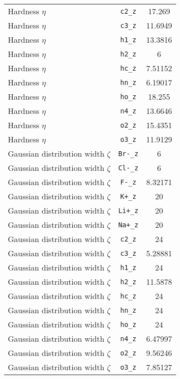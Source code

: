 \begin{table}[ht]
\begin{tabular}{lcc}
Hardness $\eta$ & \verb^c2_z^ & 17.269 \\ 
Hardness $\eta$ & \verb^c3_z^ & 11.6949 \\ 
Hardness $\eta$ & \verb^h1_z^ & 13.3816 \\ 
Hardness $\eta$ & \verb^h2_z^ & 6 \\ 
Hardness $\eta$ & \verb^hc_z^ & 7.51152 \\ 
Hardness $\eta$ & \verb^hn_z^ & 6.19017 \\ 
Hardness $\eta$ & \verb^ho_z^ & 18.255 \\ 
Hardness $\eta$ & \verb^n4_z^ & 13.6646 \\ 
Hardness $\eta$ & \verb^o2_z^ & 15.4351 \\ 
Hardness $\eta$ & \verb^o3_z^ & 11.9129 \\ 
Gaussian distribution width $\zeta$ & \verb^Br-_z^ & 6 \\ 
Gaussian distribution width $\zeta$ & \verb^Cl-_z^ & 6 \\ 
Gaussian distribution width $\zeta$ & \verb^F-_z^ & 8.32171 \\ 
Gaussian distribution width $\zeta$ & \verb^K+_z^ & 20 \\ 
Gaussian distribution width $\zeta$ & \verb^Li+_z^ & 20 \\ 
Gaussian distribution width $\zeta$ & \verb^Na+_z^ & 20 \\ 
Gaussian distribution width $\zeta$ & \verb^c2_z^ & 24 \\ 
Gaussian distribution width $\zeta$ & \verb^c3_z^ & 5.28881 \\ 
Gaussian distribution width $\zeta$ & \verb^h1_z^ & 24 \\ 
Gaussian distribution width $\zeta$ & \verb^h2_z^ & 11.5878 \\ 
Gaussian distribution width $\zeta$ & \verb^hc_z^ & 24 \\ 
Gaussian distribution width $\zeta$ & \verb^hn_z^ & 24 \\ 
Gaussian distribution width $\zeta$ & \verb^ho_z^ & 24 \\ 
Gaussian distribution width $\zeta$ & \verb^n4_z^ & 6.47997 \\ 
Gaussian distribution width $\zeta$ & \verb^o2_z^ & 9.56246 \\ 
Gaussian distribution width $\zeta$ & \verb^o3_z^ & 7.85127 \\ 
\hline
\end{tabular}
\end{table}
